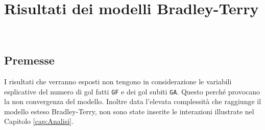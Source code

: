 
\chapter{Risultati dei modelli Bradley-Terry}
\label{cap:risultatiDM}

\\

\section{Premesse}
I risultati che verranno esposti non tengono in considerazione le variabili esplicative del numero di gol fatti \texttt{GF} e dei gol subiti \texttt{GA}. Questo perché provocano la non convergenza del modello. Inoltre data l'elevata complessità che raggiunge il modello esteso Bradley-Terry, non sono state inserite le interazioni illustrate nel Capitolo \ref{cap:Analisi}.

